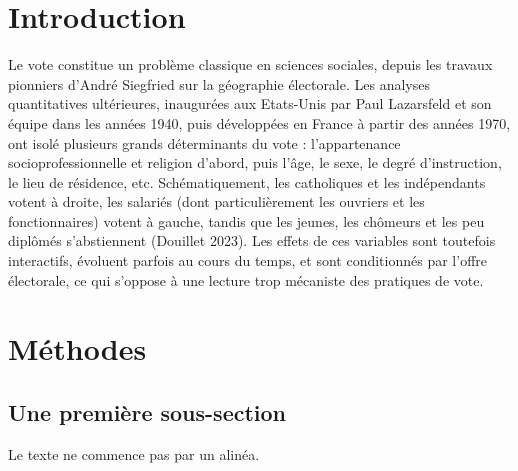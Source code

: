 \documentclass[a4paper, 12pt]{article}
\begin{document}
\section{Introduction}
Le vote constitue un problème classique en sciences sociales, depuis les travaux pionniers d’André Siegfried sur la géographie électorale. Les analyses quantitatives ultérieures, inaugurées aux Etats-Unis par Paul Lazarsfeld et son équipe dans les années 1940, puis développées en France à partir des années 1970, ont isolé plusieurs grands déterminants du vote : l’appartenance socioprofessionnelle et religion d’abord, puis l’âge, le sexe, le degré d’instruction, le lieu de résidence, etc. Schématiquement, les catholiques et les indépendants votent à droite, les salariés (dont particulièrement les ouvriers et les fonctionnaires) votent à gauche, tandis que les jeunes, les chômeurs et les peu diplômés s’abstiennent (Douillet 2023). Les effets de ces variables sont toutefois interactifs, évoluent parfois au cours du temps, et sont conditionnés par l’offre électorale, ce qui s’oppose à une lecture trop mécaniste des pratiques de vote.
\section{Méthodes}
\subsection{Une première sous-section}
Le texte ne commence pas par un alinéa.
\end{document}
